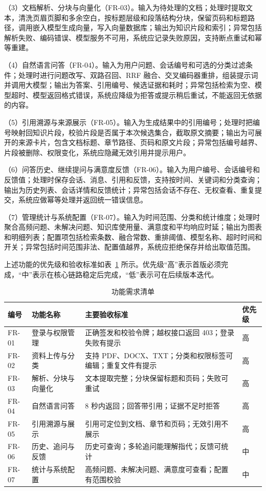 （3）文档解析、分块与向量化（FR-03）。输入为待处理的文档；处理时提取文本，清洗页眉页脚和多余空白，按标题层级和段落结构分块，保留页码和标题路径，调用嵌入模型生成向量，写入向量数据库；输出为知识片段和索引；异常包括解析失败、编码错误、模型服务不可用，系统应记录失败原因，支持断点重试和幂等重建。

（4）自然语言问答（FR-04）。输入为用户问题、会话编号和可选的分类过滤条件；处理时进行问题改写、双路召回、RRF 融合、交叉编码器重排，组装提示词并调用大模型；输出为答案、引用编号、候选证据和耗时；异常包括检索为空、模型超时、模型返回格式错误，系统应降级为拒答或提示稍后重试，不能返回无依据的内容。

（5）引用溯源与来源展示（FR-05）。输入为生成结果中的引用编号；处理时把编号映射回知识片段，校验片段是否属于本次候选集合，截取原文摘要；输出为可展开的来源卡片，包含文档标题、章节路径、页码和原文片段；异常包括编号越界、片段被删除、权限变化，系统应隐藏无效引用并提示用户。

（6）问答历史、继续提问与满意度反馈（FR-06）。输入为用户编号、会话编号和反馈值；处理时保存会话、消息、引用和反馈，支持按时间、关键词和分类查询；输出为历史列表、会话详情和反馈统计；异常包括会话不存在、无权查看、重复提交，系统应做幂等处理并返回统一错误信息。

（7）管理统计与系统配置（FR-07）。输入为时间范围、分类和统计维度；处理时聚合高频问题、未解决问题、知识库使用量、满意度和平均响应时延；输出为图表和明细列表；配置项包括检索条数、融合常数、重排阈值、模型名称、超时时间和开关；异常包括时间范围非法、配置值越界，系统应拒绝保存并给出取值范围。

上述功能的优先级和验收标准如表~\ref{tab:function-list} 所示。优先级“高”表示首版必须完成，“中”表示在核心链路稳定后完成，“低”表示可在后续版本迭代。

\begin{table}[H]
  \centering
  \caption{功能需求清单}
  \label{tab:function-list}
  \renewcommand{\arraystretch}{1.25}
  \begin{tabular}{p{1.3cm}p{3.2cm}p{6.8cm}p{1.4cm}}
    \toprule
    编号 & 功能名称 & 主要验收标准 & 优先级 \\
    \midrule
    FR-01 & 登录与权限管理 & 正确签发和校验令牌；越权接口返回 403；登录失败有提示 & 高 \\
    FR-02 & 资料上传与分类 & 支持 PDF、DOCX、TXT；分类和权限标签可编辑；重复文件有提示 & 高 \\
    FR-03 & 解析、分块与向量化 & 文本提取完整；分块保留标题和页码；失败可重试 & 高 \\
    FR-04 & 自然语言问答 & 8 秒内返回；回答带引用；证据不足时拒答 & 高 \\
    FR-05 & 引用溯源与展示 & 引用可定位到文档、章节和页码；无效引用不展示 & 高 \\
    FR-06 & 历史、追问与反馈 & 历史可查询；多轮追问能理解指代；反馈可统计 & 中 \\
    FR-07 & 统计与系统配置 & 高频问题、未解决问题、满意度可查看；配置有范围校验 & 中 \\
    \bottomrule
  \end{tabular}
\end{table}

